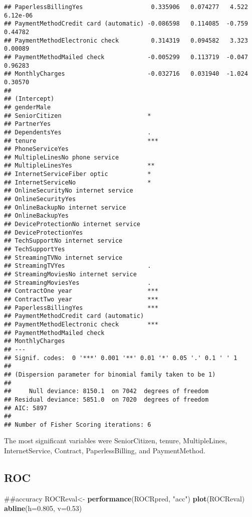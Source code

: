 \documentclass[]{article}
\newenvironment{Shaded}{\begin{snugshade}}{\end{snugshade}}
\newcommand{\KeywordTok}[1]{\textcolor[rgb]{0.13,0.29,0.53}{\textbf{#1}}}
\newcommand{\DataTypeTok}[1]{\textcolor[rgb]{0.13,0.29,0.53}{#1}}
\newcommand{\FloatTok}[1]{\textcolor[rgb]{0.00,0.00,0.81}{#1}}
\newcommand{\StringTok}[1]{\textcolor[rgb]{0.31,0.60,0.02}{#1}}
\newcommand{\NormalTok}[1]{#1}
\begin{document}
\begin{verbatim}
## PaperlessBillingYes                   0.335906   0.074277   4.522 6.12e-06
## PaymentMethodCredit card (automatic) -0.086598   0.114085  -0.759  0.44782
## PaymentMethodElectronic check         0.314319   0.094582   3.323  0.00089
## PaymentMethodMailed check            -0.005299   0.113719  -0.047  0.96283
## MonthlyCharges                       -0.032716   0.031940  -1.024  0.30570
##                                         
## (Intercept)                             
## genderMale                              
## SeniorCitizen                        *  
## PartnerYes                              
## DependentsYes                        .  
## tenure                               ***
## PhoneServiceYes                         
## MultipleLinesNo phone service           
## MultipleLinesYes                     ** 
## InternetServiceFiber optic           *  
## InternetServiceNo                    *  
## OnlineSecurityNo internet service       
## OnlineSecurityYes                       
## OnlineBackupNo internet service         
## OnlineBackupYes                         
## DeviceProtectionNo internet service     
## DeviceProtectionYes                     
## TechSupportNo internet service          
## TechSupportYes                          
## StreamingTVNo internet service          
## StreamingTVYes                       .  
## StreamingMoviesNo internet service      
## StreamingMoviesYes                   .  
## ContractOne year                     ***
## ContractTwo year                     ***
## PaperlessBillingYes                  ***
## PaymentMethodCredit card (automatic)    
## PaymentMethodElectronic check        ***
## PaymentMethodMailed check               
## MonthlyCharges                          
## ---
## Signif. codes:  0 '***' 0.001 '**' 0.01 '*' 0.05 '.' 0.1 ' ' 1
## 
## (Dispersion parameter for binomial family taken to be 1)
## 
##     Null deviance: 8150.1  on 7042  degrees of freedom
## Residual deviance: 5851.0  on 7020  degrees of freedom
## AIC: 5897
## 
## Number of Fisher Scoring iterations: 6
\end{verbatim}

The most significant variables were SeniorCitizen, tenure,
MultipleLines, InternetService, Contract, PaperlessBilling, and
PaymentMethod.

\subsection{ROC}\label{roc}

\begin{Shaded}
\begin{Highlighting}[]
\NormalTok{##accuracy}
\NormalTok{ROCReval<-}\StringTok{ }\KeywordTok{performance}\NormalTok{(ROCRpred, }\StringTok{"acc"}\NormalTok{)}
\KeywordTok{plot}\NormalTok{(ROCReval)}
\KeywordTok{abline}\NormalTok{(}\DataTypeTok{h=}\FloatTok{0.805}\NormalTok{, }\DataTypeTok{v=}\FloatTok{0.53}\NormalTok{)}
\end{Highlighting}
\end{Shaded}
\end{document}
